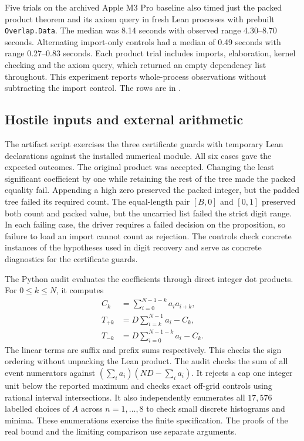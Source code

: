\documentclass[sigplan,10pt,anonymous,review,balance=false]{acmart}
\newcommand{\leanid}[1]{\texttt{#1}}
\begin{document}
Five trials on the archived Apple M3 Pro baseline also timed just the
packed product theorem and its axiom query in fresh Lean processes with prebuilt
\leanid{Overlap.Data}. The median was 8.14 seconds with observed
range 4.30--8.70 seconds. Alternating import-only controls had a
median of 0.49 seconds with range 0.27--0.83 seconds. Each product
trial includes imports, elaboration, kernel checking and the axiom
query, which returned an empty dependency list throughout. This
experiment reports whole-process observations without subtracting
the import control. The rows are in
.

\subsection{Hostile inputs and external arithmetic}
\label{sec:controls}

The artifact script  exercises
the three certificate guards with temporary Lean declarations
against the installed numerical module. All six cases gave the
expected outcomes. The original product was accepted. Changing
the least significant coefficient by one while retaining the
rest of the tree made the packed equality fail. Appending a high
zero preserved the packed integer, but the padded tree failed its
required count. The equal-length pair $[B,0]$ and $[0,1]$
preserved both count and packed value, but the uncarried list
failed the strict digit range. In each failing case, the driver
requires a failed decision on the proposition, so failure to load
an import cannot count as rejection. The controls check concrete
instances of the hypotheses used in digit recovery and serve as
concrete diagnostics for the certificate guards.

The Python audit  evaluates the coefficients
through direct integer dot products. For $0\le k\le N$, it computes
\begin{equation*}
 \begin{aligned}
 C_k &=\sum_{i=0}^{N-1-k}a_i a_{i+k},\\
 T_{+k} &=D\sum_{i=k}^{N-1}a_i-C_k,\\
 T_{-k} &=D\sum_{i=0}^{N-1-k}a_i-C_k .
 \end{aligned}
\end{equation*}
The linear terms are suffix and prefix sums respectively. This
checks the sign ordering without unpacking the Lean product.
The audit checks the sum of all event numerators against
$(\sum_i a_i)(ND-\sum_i a_i)$. It rejects a cap one
integer unit below the reported maximum and checks exact off-grid
controls using rational interval intersections. It also independently
enumerates all $17{,}576$ labelled choices of $A$ across
$n=1,\ldots,8$ to check small discrete histograms and minima.
These enumerations exercise the finite specification. The proofs
of the real bound and the limiting comparison
use separate arguments.
\end{document}
